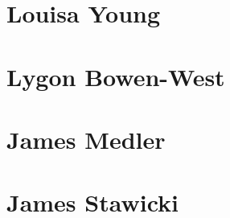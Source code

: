 \section{Louisa Young}
\label{sec:louisa_young}

\lipsum[1-4]


\section{Lygon Bowen-West}
\label{sec:lygon_bowen_west}

\lipsum[1-4]


\section{James Medler}
\label{sec:james_medler}

\lipsum[1-4]


\section{James Stawicki}
\label{sec:james_stawicki}

\lipsum[1-4]


